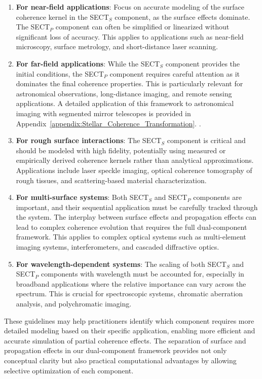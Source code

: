 \documentclass[a4paper,12pt]{article}
\begin{document}
\begin{enumerate}
\item \textbf{For near-field applications}: Focus on accurate modeling of the surface coherence kernel in the SECT$_S$ 
component, as the surface effects dominate. The SECT$_P$ component can often be simplified or linearized without 
significant loss of accuracy. This applies to applications such as near-field microscopy, surface metrology, and 
short-distance laser scanning.

\item \textbf{For far-field applications}: While the SECT$_S$ component provides the initial conditions, the SECT$_P$ 
component requires careful attention as it dominates the final coherence properties. This is particularly relevant 
for astronomical observations, long-distance imaging, and remote sensing applications.
A detailed application of this framework to astronomical imaging with segmented mirror telescopes is provided in 
Appendix~\ref{appendix:Stellar_Coherence_Transformation}.
.


\item \textbf{For rough surface interactions}: The SECT$_S$ component is critical and should be modeled with high 
fidelity, potentially using measured or empirically derived coherence kernels rather than analytical approximations. 
Applications include laser speckle imaging, optical coherence tomography of rough tissues, and scattering-based material 
characterization.

\item \textbf{For multi-surface systems}: Both SECT$_S$ and SECT$_P$ components are important, and their sequential 
application must be carefully tracked through the system. The interplay between surface effects and propagation 
effects can lead to complex coherence evolution that requires the full dual-component framework. 
This applies to complex optical systems such as multi-element imaging systems, interferometers, and 
cascaded diffractive optics.

\item \textbf{For wavelength-dependent systems}: The scaling of both SECT$_S$ and SECT$_P$ components with wavelength 
must be accounted for, especially in broadband applications where the relative importance can vary across the spectrum. 
This is crucial for spectroscopic systems, chromatic aberration analysis, and polychromatic imaging.
\end{enumerate}

These guidelines may help practitioners identify which component requires more detailed modeling based on their specific application, enabling more efficient and accurate simulation of partial coherence effects. The separation of surface and propagation effects in our dual-component framework provides not only conceptual clarity but also practical computational advantages by allowing selective optimization of each component.
\end{document}

